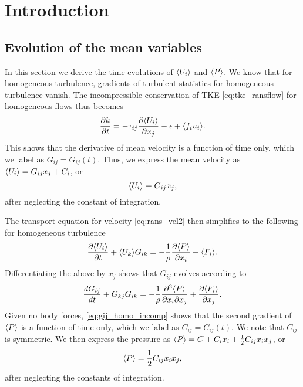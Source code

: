 \documentclass[oneside,a4paper,11pt]{report}
\begin{document}
%
\chapter{Introduction}
%

\section{Evolution of the mean variables}
\label{sec:homo_mean_incomp}
In this section we derive the time evolutions of $\langle U_i \rangle$ and $\langle P \rangle$. We know that for homogeneous turbulence, gradients of turbulent statistics for homogeneous turbulence vanish. The incompressible conservation of TKE \cref{eq:tke_ransflow} for homogeneous flows thus becomes
\begin{equation}
\frac{\partial k}{\partial t} = -\tau_{ij} \frac{\partial \langle U_i \rangle}{\partial x_j} - \epsilon + \langle f_i u_i \rangle.
\end{equation}
This shows that the derivative of mean velocity is a function of time only, which we label as $G_{ij} = G_{ij}(t)$. Thus, we express the mean velocity as $\langle U_i \rangle = G_{ij} x_j + C_i$, or 
\begin{equation}
\label{eq:ui_homo_incomp}
\langle U_i \rangle = G_{ij} x_j ,
\end{equation}
after neglecting the constant of integration.

The transport equation for velocity \cref{eq:rans_vel2} then simplifies to the following for homogeneous turbulence
\begin{equation}
\frac{\partial \langle U_i \rangle}{\partial t} + \langle U_k \rangle G_{ik} = -\frac{1}{\rho} \frac{\partial \langle P \rangle}{\partial x_i} + \langle F_i \rangle.
\end{equation}
Differentiating the above by $x_j$ shows that $G_{ij}$ evolves according to
\begin{equation}
\label{eq:gij_homo_incomp}
\frac{d G_{ij} }{d t} + G_{kj}G_{ik} = -\frac{1}{\rho} \frac{\partial ^2 \langle P \rangle}{\partial x_i \partial x_j} + \frac{\partial \langle F_i \rangle}{\partial x_j} .
\end{equation}
Given no body forces, \cref{eq:gij_homo_incomp} shows that the second gradient of $\langle P \rangle$ is a function of time only, which we label as $C_{ij} = C_{ij}(t)$. We note that $C_{ij}$ is symmetric. We then express the pressure as $\langle P \rangle = C + C_i x_i + \frac{1}{2} C_{ij} x_ix_j$, or
\begin{equation}
    \langle P \rangle = \frac{1}{2} C_{ij} x_i x_j,
\end{equation}
after neglecting the constants of integration. 
\end{document}

